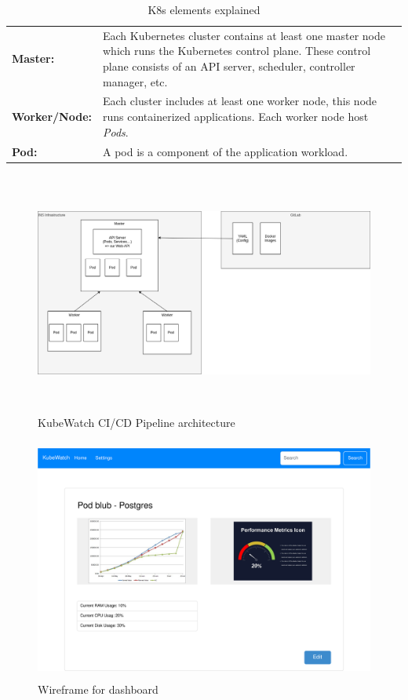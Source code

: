 \begin{table}[h]
  \centering
  \caption{\label{tab:k8s-elements-explained}K8s elements explained}
  \begin{tabular*}{\textwidth}{p{4cm} | p{9cm}}
    \textbf{Master:}
      & Each Kubernetes cluster contains at least one master node which runs the Kubernetes control plane. These control plane consists of an API server, scheduler, controller manager, etc. \\
    \textbf{Worker/Node:}
      & Each cluster includes at least one worker node, this node runs containerized applications. Each worker node host \textit{Pods}. \\
    \textbf{Pod:}
      & A pod is a component of the application workload. \\
  \end{tabular*}
\end{table}

\begin{figure}[h]
  \centering
  \caption{KubeWatch CI/CD Pipeline architecture}
  \label{fig:architecture}
  \includegraphics[height=8cm]{resources/architecture.png}
\end{figure}

\begin{figure}[h]
  \centering
  \caption{\label{fig:wireframe-dashboard}Wireframe for dashboard}
  \includegraphics[height=8cm]{resources/wireframe_kubewatch-Dashboard.png}
\end{figure}

